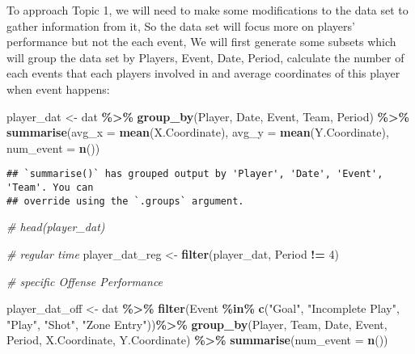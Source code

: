 \documentclass[
  a3paper,
]{article}
\newenvironment{Shaded}{\begin{snugshade}}{\end{snugshade}}
\newcommand{\AttributeTok}[1]{\textcolor[rgb]{0.13,0.29,0.53}{#1}}
\newcommand{\CommentTok}[1]{\textcolor[rgb]{0.56,0.35,0.01}{\textit{#1}}}
\newcommand{\DecValTok}[1]{\textcolor[rgb]{0.00,0.00,0.81}{#1}}
\newcommand{\FunctionTok}[1]{\textcolor[rgb]{0.13,0.29,0.53}{\textbf{#1}}}
\newcommand{\NormalTok}[1]{#1}
\newcommand{\OtherTok}[1]{\textcolor[rgb]{0.56,0.35,0.01}{#1}}
\newcommand{\SpecialCharTok}[1]{\textcolor[rgb]{0.81,0.36,0.00}{\textbf{#1}}}
\newcommand{\StringTok}[1]{\textcolor[rgb]{0.31,0.60,0.02}{#1}}
\begin{document}
To approach Topic 1, we will need to make some modifications to the data
set to gather information from it, So the data set will focus more on
players' performance but not the each event, We will first generate some
subsets which will group the data set by Players, Event, Date, Period,
calculate the number of each events that each players involved in and
average coordinates of this player when event happens:

\begin{Shaded}
\begin{Highlighting}[]
\NormalTok{player\_dat }\OtherTok{\textless{}{-}}\NormalTok{ dat }\SpecialCharTok{\%\textgreater{}\%} \FunctionTok{group\_by}\NormalTok{(Player, Date, Event, Team, Period) }\SpecialCharTok{\%\textgreater{}\%} 
  \FunctionTok{summarise}\NormalTok{(}\AttributeTok{avg\_x =} \FunctionTok{mean}\NormalTok{(X.Coordinate), }\AttributeTok{avg\_y =} \FunctionTok{mean}\NormalTok{(Y.Coordinate), }\AttributeTok{num\_event =} \FunctionTok{n}\NormalTok{())}
\end{Highlighting}
\end{Shaded}

\begin{verbatim}
## `summarise()` has grouped output by 'Player', 'Date', 'Event', 'Team'. You can
## override using the `.groups` argument.
\end{verbatim}

\begin{Shaded}
\begin{Highlighting}[]
\CommentTok{\# head(player\_dat)}

\CommentTok{\# regular time}
\NormalTok{player\_dat\_reg }\OtherTok{\textless{}{-}} \FunctionTok{filter}\NormalTok{(player\_dat, Period }\SpecialCharTok{!=} \DecValTok{4}\NormalTok{)}


\CommentTok{\# specific Offense Performance}

\NormalTok{player\_dat\_off }\OtherTok{\textless{}{-}}\NormalTok{  dat }\SpecialCharTok{\%\textgreater{}\%}
  \FunctionTok{filter}\NormalTok{(Event }\SpecialCharTok{\%in\%} \FunctionTok{c}\NormalTok{(}\StringTok{"Goal"}\NormalTok{, }\StringTok{"Incomplete Play"}\NormalTok{, }\StringTok{"Play"}\NormalTok{, }\StringTok{"Shot"}\NormalTok{, }\StringTok{"Zone Entry"}\NormalTok{))}\SpecialCharTok{\%\textgreater{}\%}
  \FunctionTok{group\_by}\NormalTok{(Player, Team, Date, Event, Period, X.Coordinate, Y.Coordinate) }\SpecialCharTok{\%\textgreater{}\%}
  \FunctionTok{summarise}\NormalTok{(}\AttributeTok{num\_event =} \FunctionTok{n}\NormalTok{())}
\end{Highlighting}
\end{Shaded}
\end{document}
